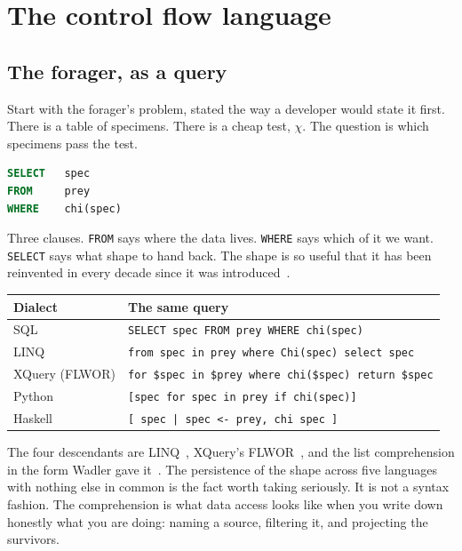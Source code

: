 \section{The control flow language}
\label{sec:cfl}

\subsection{The forager, as a query}

Start with the forager's problem, stated the way a developer would state it
first. There is a table of specimens. There is a cheap test, $\chi$. The
question is which specimens pass the test.

\begin{lstlisting}[language=SQL,morekeywords={SELECT,FROM,WHERE}]
SELECT   spec
FROM     prey
WHERE    chi(spec)
\end{lstlisting}

Three clauses. \texttt{FROM} says where the data lives. \texttt{WHERE} says
which of it we want. \texttt{SELECT} says what shape to hand back. The shape is
so useful that it has been reinvented in every decade since it was
introduced~\cite{Codd70,ChamberlinBoyce74}.

\begin{center}
\small
\begin{tabular}{@{}ll@{}}
\toprule
\textbf{Dialect} & \textbf{The same query} \\
\midrule
SQL & \texttt{SELECT spec FROM prey WHERE chi(spec)} \\
LINQ & \texttt{from spec in prey where Chi(spec) select spec} \\
XQuery (FLWOR) & \texttt{for \$spec in \$prey where chi(\$spec) return \$spec} \\
Python & \texttt{[spec for spec in prey if chi(spec)]} \\
Haskell & \texttt{[ spec | spec <- prey, chi spec ]} \\
\bottomrule
\end{tabular}
\end{center}

The four descendants are LINQ~\cite{LINQ}, XQuery's
FLWOR~\cite{XQuery}, and the list comprehension in the form Wadler gave
it~\cite{Wadler87}. The persistence of the shape across five languages with
nothing else in common
is the fact worth taking seriously. It is not a syntax fashion. The comprehension
is what data access looks like when you write down honestly what you are doing:
naming a source, filtering it, and projecting the survivors.

